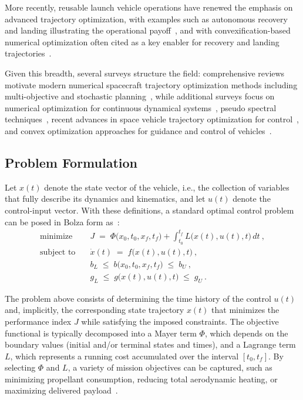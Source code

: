 More recently, reusable launch vehicle operations have renewed the emphasis on advanced trajectory optimization, with examples such as autonomous recovery and landing illustrating the operational payoff~\cite{Edberg}, and with convexification-based numerical optimization often cited as a key enabler for recovery and landing trajectories~\cite{Convex}.

Given this breadth, several surveys structure the field: comprehensive reviews motivate modern numerical spacecraft trajectory optimization methods including multi-objective and stochastic planning~\cite{Optimization_Review}, while additional surveys focus on numerical optimization for continuous dynamical systems~\cite{BettsSurvey1998}, pseudo spectral techniques~\cite{RaoPseudo}, recent advances in space vehicle trajectory optimization for control~\cite{MALYUTA2021282}, and convex optimization approaches for guidance and control of vehicles~\cite{WANG2024100957}.


\subsection{Problem Formulation}

Let $x(t)$ denote the state vector of the vehicle, i.e., the collection of variables that fully describe its dynamics and kinematics, and let $u(t)$ denote the control-input vector. With these definitions, a standard optimal control problem can be posed in Bolza form as~\cite{Optimization_Review}:
\begin{subequations}\label{eq:ocp}
\begin{align}
\text{minimize} \quad
& J \;=\; \Phi\!\bigl(x_0,t_0,x_f,t_f\bigr)
+ \int_{t_0}^{t_f} L\!\bigl(x(t),u(t),t\bigr)\,dt \ ,
\label{eq:ocp_obj} \\[2mm]
\text{subject to}\quad
& \dot{x}(t) \;=\; f\!\bigl(x(t),u(t),t\bigr) \ ,
\label{eq:ocp_dyn} \\
& b_L \;\le\; b\!\bigl(x_0,t_0,x_f,t_f\bigr) \;\le\; b_U \ ,
\label{eq:ocp_bnd} \\
& g_L \;\le\; g\!\bigl(x(t),u(t),t\bigr) \;\le\; g_U \ .
\label{eq:ocp_path}
\end{align}
\end{subequations}

The problem above consists of determining the time history of the control $u(t)$ and, implicitly, the corresponding state trajectory $x(t)$ that minimizes the performance index $J$ while satisfying the imposed constraints. The objective functional is typically decomposed into a Mayer term $\Phi$, which depends on the boundary values (initial and/or terminal states and times), and a Lagrange term $L$, which represents a running cost accumulated over the interval $[t_0,t_f]$. By selecting $\Phi$ and $L$, a variety of mission objectives can be captured, such as minimizing propellant consumption, reducing total aerodynamic heating, or maximizing delivered payload~\cite{300years}.


